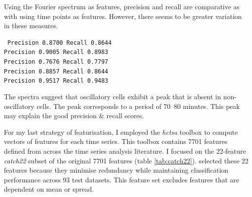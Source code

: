 Using the Fourier spectrum as features, precision and recall are comparative as with using time points as
features.
However, there seems to be greater variation in these measures.

\texttt{
     Precision 0.8700 Recall 0.8644\\
     Precision 0.9005 Recall 0.8983\\
     Precision 0.7676 Recall 0.7797\\
     Precision 0.8857 Recall 0.8644\\
     Precision 0.9517 Recall 0.9483\\
}

The spectra suggest that oscillatory cells exhibit a peak that is absent in non-oscillatory cells.
The peak corresponds to a period of 70~80 minutes.
This peak may explain the good precision \& recall scores.

For my last strategy of featurisation,
I employed the \textit{hctsa} toolbox \parencite{fulcherHctsaComputationalFramework2017} to compute vectors of features for each time series.
This toolbox contains 7701 features defined from across the time series analysis literature.
I focused on the 22-feature \textit{catch22} subset of the original 7701 features (table \ref{tab:catch22}).
\textcite{lubbaCatch22CAnonicalTimeseries2019} selected these 22 features because they minimise redundancy while maintaining classification performance across 93 test datasets.
This feature set excludes features that are dependent on mean or spread.

